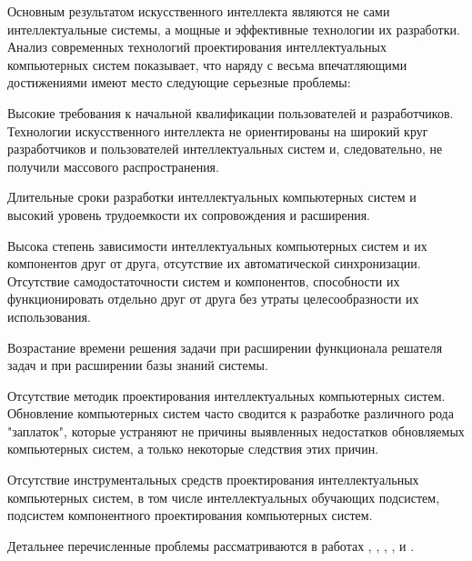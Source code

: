 \begin{partbacktext}
Основным результатом искусственного интеллекта являются не сами интеллектуальные системы, а мощные и эффективные технологии их разработки. Анализ современных технологий проектирования интеллектуальных компьютерных систем показывает, что наряду с весьма впечатляющими достижениями имеют место следующие серьезные проблемы:
\begin{textitemize}
	\item Высокие требования к начальной квалификации пользователей и разработчиков. Технологии искусственного интеллекта не ориентированы на широкий круг разработчиков и пользователей интеллектуальных систем и, следовательно, не получили массового распространения.
	\item Длительные сроки разработки интеллектуальных компьютерных систем и высокий уровень трудоемкости их сопровождения и расширения.
	\item Высока степень зависимости интеллектуальных компьютерных систем и их компонентов друг от друга, отсутствие их автоматической синхронизации. Отсутствие самодостаточности систем и компонентов, способности их функционировать отдельно друг от друга без утраты целесообразности их использования.
	\item Возрастание времени решения задачи при расширении функционала решателя задач и при расширении базы знаний системы.
	\item Отсутствие методик проектирования интеллектуальных компьютерных систем. Обновление компьютерных систем часто сводится к разработке различного рода "заплаток"{}, которые устраняют не причины выявленных недостатков обновляемых компьютерных систем, а только некоторые следствия этих причин.
	\item Отсутствие инструментальных средств проектирования интеллектуальных компьютерных систем, в том числе интеллектуальных обучающих подсистем, подсистем компонентного проектирования компьютерных систем.
\end{textitemize}
Детальнее перечисленные проблемы рассматриваются в работах , , , ,  и .


\end{partbacktext}
